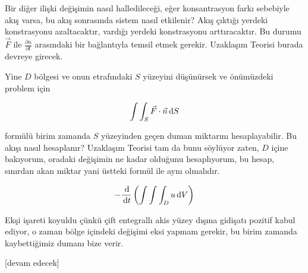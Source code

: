 \documentclass[12pt,fleqn]{article}\usepackage{../../common}
\begin{document}
Bir diğer ilişki değişimin nasıl halledileceği, eğer konsantrasyon farkı
sebebiyle akış varsa, bu akış sonrasında sistem nasıl etkilenir? Akış çıktığı
yerdeki konstrasyonu azaltacaktır, vardığı yerdeki konstrasyonu arttıracaktır.
Bu durumu $\vec{F}$ ile $\frac{\partial u}{\partial t}$ arasındaki bir
bağlantıyla temsil etmek gerekir. Uzaklaşım Teorisi burada devreye girecek.

Yine $D$ bölgesi ve onun etrafındaki $S$ yüzeyini düşünürsek ve önümüzdeki
problem için

$$
\int \int_S \vec{F} \cdot \vec{n} \,\mathrm{d} S
$$

formülü birim zamanda $S$ yüzeyinden geçen duman miktarını hesaplayabilir.  Bu
akışı nasıl hesaplanır? Uzaklaşım Teorisi tam da bunu söylüyor zaten, $D$ içine
bakıyorum, oradaki değişimin ne kadar olduğunu hesaplıyorum, bu hesap, sınırdan
akan miktar yani üstteki formül ile aynı olmalıdır.

$$
- \frac{\,\mathrm{d} }{\,\mathrm{d} t} \left(
\int \int \int_D u \,\mathrm{d} V
\right)
$$

Ekşi işareti koyuldu çünkü çift entegrallı akis yüzey dışına gidişatı pozitif
kabul ediyor, o zaman bölge içindeki değişimi eksi yapmam gerekir, bu
birim zamanda kaybettiğimiz dumanı bize verir.


[devam edecek]
\end{document}
